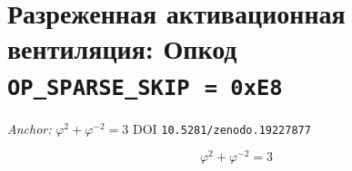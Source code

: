 %

\theoremstyle{plain}
\newtheorem{theorem}{Теорема}[chapter]
\newtheorem{lemma}[theorem]{Лемма}
\newtheorem{corollary}[theorem]{Следствие}
\newtheorem{definition}{Определение}[chapter]
\newtheorem{remark}{Замечание}[chapter]
\newtheorem{proposition}[theorem]{Утверждение}

\chapter{Разреженная активационная вентиляция: Опкод
  \texttt{OP\_SPARSE\_SKIP}~\texttt{=~0xE8}}%
\label{ch:glava87-sparse}

%
\noindent\textit{Anchor: } $\varphi^{2} + \varphi^{-2} = 3$ \quad DOI
\texttt{10.5281/zenodo.19227877}

\[
  \varphi^{2} + \varphi^{-2} = 3
\]

